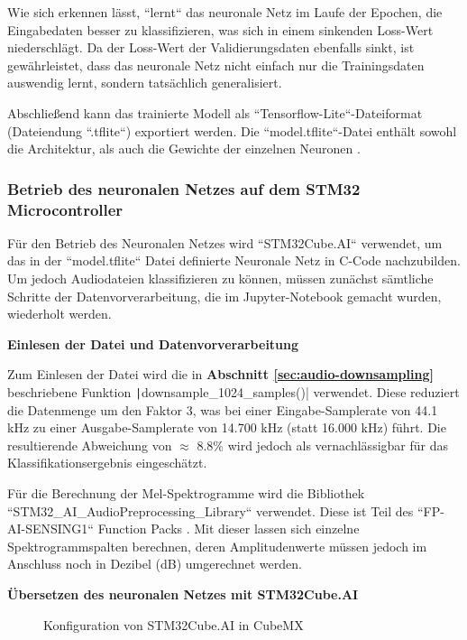 Wie sich erkennen lässt, ``lernt`` das neuronale Netz im Laufe der Epochen, die Eingabedaten besser zu klassifizieren, was sich in einem sinkenden Loss-Wert niederschlägt. Da der Loss-Wert der Validierungsdaten ebenfalls sinkt, ist gewährleistet, dass das neuronale Netz nicht einfach nur die Trainingsdaten auswendig lernt, sondern tatsächlich generalisiert.

Abschließend kann das trainierte Modell als ``Tensorflow-Lite``-Dateiformat (Dateiendung ``.tflite``) exportiert werden. Die ``model.tflite``-Datei enthält sowohl die Architektur, als auch die Gewichte der einzelnen Neuronen \cite{tflite-file}.


\subsubsection{Betrieb des neuronalen Netzes auf dem STM32 Microcontroller}

Für den Betrieb des Neuronalen Netzes wird ``STM32Cube.AI`` verwendet, um das in der ``model.tflite`` Datei definierte Neuronale Netz in C-Code nachzubilden. Um jedoch Audiodateien klassifizieren zu können, müssen zunächst sämtliche Schritte der Datenvorverarbeitung, die im Jupyter-Notebook gemacht wurden, wiederholt werden.

\textbf{Einlesen der Datei und Datenvorverarbeitung}


Zum Einlesen der Datei wird die in \textbf{Abschnitt \ref{sec:audio-downsampling}} beschriebene Funktion \texttt|downsample_1024_samples()| verwendet. Diese reduziert die Datenmenge um den Faktor 3, was bei einer Eingabe-Samplerate von 44.1 kHz zu einer Ausgabe-Samplerate von 14.700 kHz (statt 16.000 kHz) führt. Die resultierende Abweichung von $\approx$ 8.8\% wird jedoch als vernachlässigbar für das Klassifikationsergebnis eingeschätzt.

Für die Berechnung der Mel-Spektrogramme wird die Bibliothek ``STM32\_AI\_AudioPreprocessing\_Library`` verwendet. Diese ist Teil des ``FP-AI-SENSING1`` Function Packs \cite{fp-ai-sensing1}. Mit dieser lassen sich einzelne Spektrogrammspalten berechnen, deren Amplitudenwerte müssen jedoch im Anschluss noch in Dezibel (dB) umgerechnet werden.

\textbf{Übersetzen des neuronalen Netzes mit STM32Cube.AI}


\begin{figure} %
	\vspace{-20pt + 0.02\textwidth}
	\hspace{0.02\textwidth} %
	\caption{Konfiguration von STM32Cube.AI in CubeMX}
	\label{fig:img-training-graph}
\end{figure}

